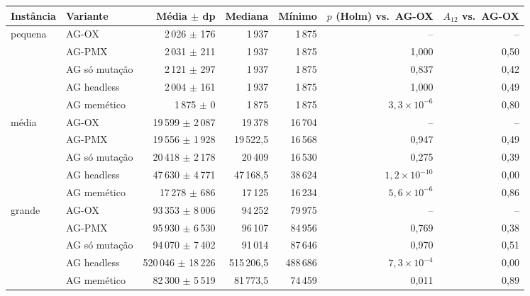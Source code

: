\begin{tabular}{llrrrrr}
\toprule
Instância & Variante & Média $\pm$ dp & Mediana & Mínimo & $p$ (Holm) vs.\ AG-OX & $A_{12}$ vs.\ AG-OX \\
\midrule
pequena & AG-OX & 2\,026 $\pm$ 176 & 1\,937 & 1\,875 & -- & -- \\
 & AG-PMX & 2\,031 $\pm$ 211 & 1\,937 & 1\,875 & 1,000 & 0,50 \\
 & AG só mutação & 2\,121 $\pm$ 297 & 1\,937 & 1\,875 & 0,837 & 0,42 \\
 & AG headless & 2\,004 $\pm$ 161 & 1\,937 & 1\,875 & 1,000 & 0,49 \\
 & AG memético & 1\,875 $\pm$ 0 & 1\,875 & 1\,875 & $3,3\times10^{-6}$ & 0,80 \\
\midrule
média & AG-OX & 19\,599 $\pm$ 2\,087 & 19\,378 & 16\,704 & -- & -- \\
 & AG-PMX & 19\,556 $\pm$ 1\,928 & 19\,522,5 & 16\,568 & 0,947 & 0,49 \\
 & AG só mutação & 20\,418 $\pm$ 2\,178 & 20\,409 & 16\,530 & 0,275 & 0,39 \\
 & AG headless & 47\,630 $\pm$ 4\,771 & 47\,168,5 & 38\,624 & $1,2\times10^{-10}$ & 0,00 \\
 & AG memético & 17\,278 $\pm$ 686 & 17\,125 & 16\,234 & $5,6\times10^{-6}$ & 0,86 \\
\midrule
grande & AG-OX & 93\,353 $\pm$ 8\,006 & 94\,252 & 79\,975 & -- & -- \\
 & AG-PMX & 95\,930 $\pm$ 6\,530 & 96\,107 & 84\,956 & 0,769 & 0,38 \\
 & AG só mutação & 94\,070 $\pm$ 7\,402 & 91\,014 & 87\,646 & 0,970 & 0,51 \\
 & AG headless & 520\,046 $\pm$ 18\,226 & 515\,206,5 & 488\,686 & $7,3\times10^{-4}$ & 0,00 \\
 & AG memético & 82\,300 $\pm$ 5\,519 & 81\,773,5 & 74\,459 & 0,011 & 0,89 \\
\bottomrule
\end{tabular}
